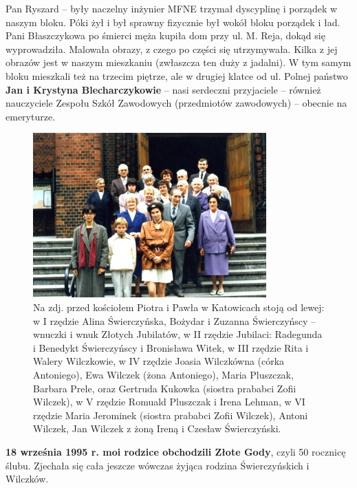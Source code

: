 Pan Ryszard – były naczelny inżynier MFNE trzymał dyscyplinę i porządek w naszym bloku. Póki żył i był sprawny fizycznie był wokół bloku porządek i ład. Pani Błaszczykowa po śmierci męża kupiła dom przy ul. M. Reja, dokąd się wyprowadziła. Malowała obrazy, z czego po części się utrzymywała. Kilka z jej obrazów jest w naszym mieszkaniu (zwłaszcza ten duży z jadalni). W tym samym bloku mieszkali też na trzecim piętrze, ale w drugiej klatce od ul. Polnej państwo\textbf{ Jan i Krystyna Blecharczykowie} – nasi serdeczni przyjaciele – również nauczyciele Zespołu Szkół Zawodowych (przedmiotów zawodowych) – obecnie na emeryturze.

\begin{figure}[!h]
\begin{center}
\includegraphics[width=0.8\textwidth]{photo/rodzina_swierczynskich_kosciol_piotra_pawla.jpg}
\caption[Złote Gody Radegundy i Benedykta Świerczyńskich -- zdjęcie zbiorowe]{Na zdj. przed kościołem Piotra i Pawła w Katowicach stoją od lewej: w I rzędzie Alina Świerczyńska, Bożydar i Zuzanna Świerczyńscy -- wnuczki i wnuk Złotych Jubilatów, w II rzędzie Jubilaci: Radegunda i Benedykt Świerczyńscy i Bronisława Witek, w III rzędzie Rita i Walery Wilczkowie, w IV rzędzie Joasia Wilczkówna (córka Antoniego), Ewa Wilczek (żona Antoniego), Maria Pluszczak, Barbara Prele, oraz Gertruda Kukowka (siostra prababci Zofii Wilczek), w V rzędzie Romuald Pluszczak i Irena Lehman, w VI rzędzie Maria Jerominek (siostra prababci Zofii Wilczek), Antoni Wilczek, Jan Wilczek z żoną Ireną i Czesław Świerczyński.}
\end{center}
\end{figure}

\textbf{18 września 1995 r. moi rodzice obchodzili Złote Gody}, czyli 50 rocznicę ślubu. Zjechała się cała jeszcze wówczas żyjąca rodzina Świerczyńskich i Wilczków.

